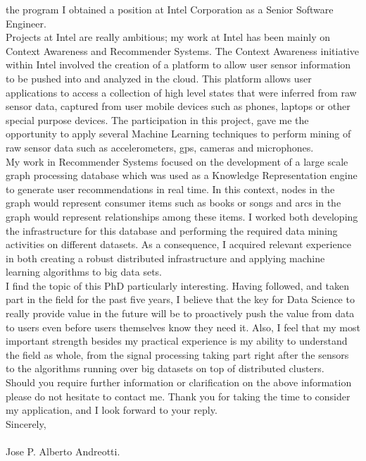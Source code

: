 \documentclass[letter,12pt,english]{article}
\begin{document}
the program I obtained a position at Intel Corporation as a Senior Software Engineer. 
\\
Projects at Intel are really ambitious; my work at Intel has been mainly on Context Awareness and 
Recommender Systems. The Context Awareness initiative within Intel involved the creation of a platform
to allow user sensor information to be pushed into and analyzed in the cloud. This platform allows 
user applications to access a collection of high level states that were inferred from raw sensor data,
captured from user mobile devices such as phones, laptops or other special purpose devices.
The participation in this project, gave me the opportunity to apply several Machine Learning
techniques to perform mining of raw sensor data such as accelerometers, gps, cameras and microphones.
\\
My work in Recommender Systems focused on the development of a large scale graph processing database which 
was used as a Knowledge Representation engine to generate user recommendations in real time.
In this context, nodes in the graph would represent consumer items such as books or 
songs and arcs in the graph would represent relationships among these items. I worked both developing the 
infrastructure for this database and performing the required data mining activities on different datasets.
As a consequence, I acquired relevant experience in both creating a robust distributed infrastructure and applying machine learning algorithms to big data sets.
\\
I find the topic of this PhD particularly interesting. Having followed, and taken part in the field for the past five years, I believe that the key for Data Science to really provide value in the future will be to proactively push the 
value from data to users even before users themselves know they need it. 
Also, I feel that my most important strength besides my practical experience is my ability to understand the field as whole, from the signal processing taking part right after the sensors to the algorithms running over big datasets on top of distributed clusters.
\\
Should you require further information or clarification on the above information please do not hesitate to contact me.
Thank you for taking the time to consider my application, and I look forward to your reply.
\\

Sincerely,
\\
\\
Jose P. Alberto Andreotti.
\end{document}
